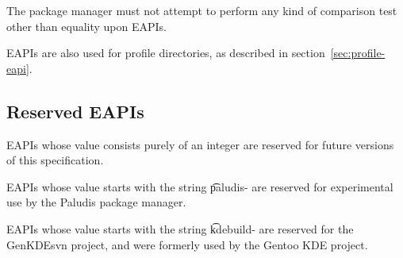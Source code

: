The package manager must not attempt to perform any kind of comparison test other than equality upon
EAPIs.

EAPIs are also used for profile directories, as described in section~\ref{sec:profile-eapi}.

\subsection{Reserved EAPIs}

\begin{compactitem}
\item EAPIs whose value consists purely of an integer are reserved for future versions of this
    specification.
\item EAPIs whose value starts with the string \t{paludis-} are reserved for experimental
    use by the Paludis package manager.
\item EAPIs whose value starts with the string \t{kdebuild-} are reserved for the GenKDEsvn
    project, and were formerly used by the Gentoo KDE project.
\end{compactitem}


